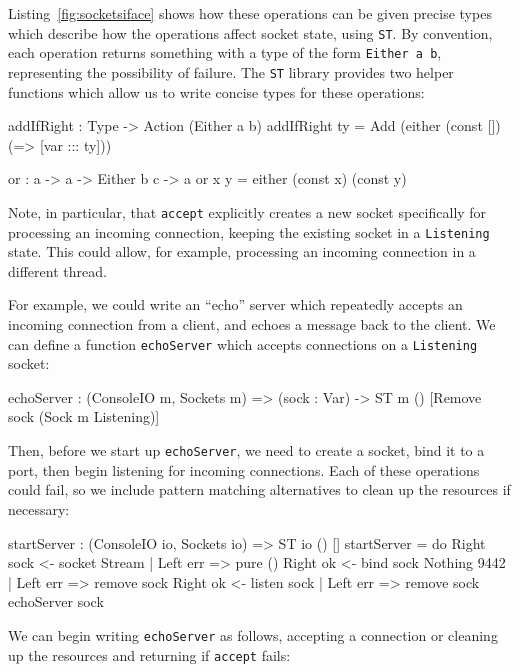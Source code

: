 Listing~\ref{fig:socketsiface} shows how these operations can be given precise
types which describe how the operations affect socket state, using \texttt{ST}.
By convention, each operation returns something with a type of the form
\texttt{Either a b}, representing the possibility of failure.
The \texttt{ST} library provides two helper functions
which allow us to write concise types for these operations:

\small
\begin{code}
addIfRight : Type -> Action (Either a b)
addIfRight ty = Add (either (const []) (\var => [var ::: ty]))

or : a -> a -> Either b c -> a
or x y = either (const x) (const y)
\end{code}
\normalsize

Note, in particular, that \texttt{accept} explicitly creates a new socket
specifically for processing an incoming connection, keeping the existing
socket in a \texttt{Listening} state. This could allow, for example, 
processing an incoming connection in a different thread.

For example, we could write an ``echo'' server which repeatedly accepts
an incoming connection from a client, and echoes a message back to the
client. We can define a function \texttt{echoServer} which accepts connections
on a \texttt{Listening} socket:

\small
\begin{code}
echoServer : (ConsoleIO m, Sockets m) => (sock : Var) -> 
             ST m () [Remove sock (Sock {m} Listening)]
\end{code}
\normalsize

Then, before we start up \texttt{echoServer}, we need to create a socket, bind
it to a port, then begin listening for incoming connections. Each of these
operations could fail, so we include pattern matching alternatives to clean
up the resources if necessary:

\small
\begin{code}
startServer : (ConsoleIO io, Sockets io) => ST io () [] 
startServer = do Right sock <- socket Stream        | Left err => pure () 
                 Right ok <- bind sock Nothing 9442 | Left err => remove sock
                 Right ok <- listen sock            | Left err => remove sock
                 echoServer sock
\end{code}
\normalsize

We can begin writing \texttt{echoServer} as follows, accepting a connection
or cleaning up the resources and returning if \texttt{accept} fails:

